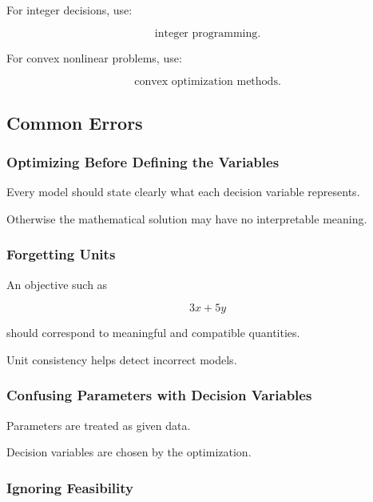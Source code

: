For integer decisions, use:

\[
\boxed{
\text{integer programming}.
}
\]

For convex nonlinear problems, use:

\[
\boxed{
\text{convex optimization methods}.
}
\]

\subsection{Common Errors}
\label{subsec:optimization-fundamentals-common-errors}

\subsubsection{Optimizing Before Defining the Variables}

Every model should state clearly what each decision variable represents.

Otherwise the mathematical solution may have no interpretable meaning.

\subsubsection{Forgetting Units}

An objective such as

\[
3x+5y
\]

should correspond to meaningful and compatible quantities.

Unit consistency helps detect incorrect models.

\subsubsection{Confusing Parameters with Decision Variables}

Parameters are treated as given data.

Decision variables are chosen by the optimization.

\subsubsection{Ignoring Feasibility}

